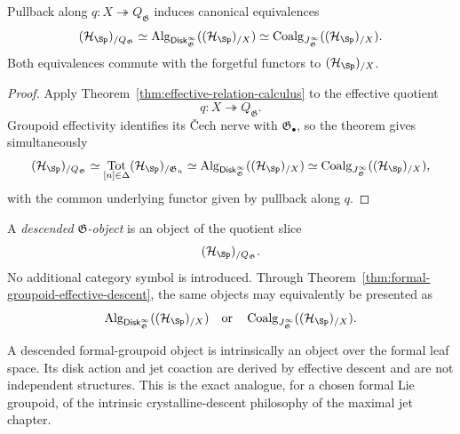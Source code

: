 \begin{theorem}
\label{thm:formal-groupoid-effective-descent}
Pullback along $q:X\twoheadrightarrow Q_{\mathfrak G}$ induces canonical
equivalences
\[
    (\mathcal H_{\Sp})_{/Q_{\mathfrak G}}
    \simeq
    \operatorname{Alg}_{\mathsf{Disk}^{\infty}_{\mathfrak G}}((\mathcal H_{\Sp})_{/X})
    \simeq
    \operatorname{Coalg}_{J^\infty_{\mathfrak G}}((\mathcal H_{\Sp})_{/X}).
\]
Both equivalences commute with the forgetful functors to
$(\mathcal H_{\Sp})_{/X}$.
\end{theorem}

\begin{proof}
Apply Theorem~\ref{thm:effective-relation-calculus} to the effective quotient
\[
    q:X\twoheadrightarrow Q_{\mathfrak G}.
\]
Groupoid effectivity identifies its \v{C}ech nerve with
$\mathfrak G_\bullet$, so the theorem gives simultaneously
\[
    (\mathcal H_{\Sp})_{/Q_{\mathfrak G}}
    \simeq
    \operatorname*{Tot}_{[n]\in\Delta}
    (\mathcal H_{\Sp})_{/\mathfrak G_n}
    \simeq
    \operatorname{Alg}_{\mathsf{Disk}^{\infty}_{\mathfrak G}}((\mathcal H_{\Sp})_{/X})
    \simeq
    \operatorname{Coalg}_{J^\infty_{\mathfrak G}}((\mathcal H_{\Sp})_{/X}),
\]
with the common underlying functor given by pullback along $q$.
\end{proof}

\begin{definition}
\label{def:formal-cartan-objects}
A \emph{descended $\mathfrak G$-object} is an object of the quotient slice
\[
    (\mathcal H_{\Sp})_{/Q_{\mathfrak G}}.
\]
No additional category symbol is introduced.  Through
Theorem~\ref{thm:formal-groupoid-effective-descent}, the same objects may
equivalently be presented as
\[
    \operatorname{Alg}_{\mathsf{Disk}^{\infty}_{\mathfrak G}}((\mathcal H_{\Sp})_{/X})
    \quad\text{or}\quad
    \operatorname{Coalg}_{J^\infty_{\mathfrak G}}((\mathcal H_{\Sp})_{/X}).
\]
\end{definition}

\begin{remark}
A descended formal-groupoid object is intrinsically an object over the formal leaf space.
Its disk action and jet coaction are derived by effective descent and are not
independent structures.  This is the exact analogue, for a chosen formal Lie
groupoid, of the intrinsic crystalline-descent philosophy of the maximal jet chapter.
\end{remark}



